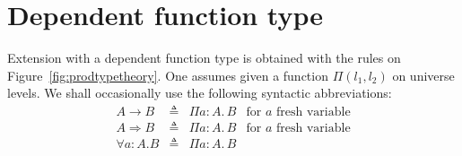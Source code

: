 \documentclass{article}
\newcommand{\defeq}{\triangleq}
\newcommand{\mkprod}[3]{\Pi {#1}\!:\!{#2}.\,{#3}}
\newcommand{\prodsort}[2]{\Pi ({#1},{#2})}
\begin{document}
\section{Dependent function type}

Extension with a dependent function type is obtained with the rules on
Figure~\ref{fig:prodtypetheory}. One assumes given a function
$\prodsort{l_1}{l_2}$ on universe levels. We shall occasionally use the following syntactic abbreviations:
$$
\begin{array}{lcll}
A \rightarrow B & \defeq & \mkprod{a}{A}{B} & \mbox{for $a$ fresh variable}\\
A \Rightarrow B & \defeq & \mkprod{a}{A}{B} & \mbox{for $a$ fresh variable}\\
\forall a:A. B & \defeq & \mkprod{a}{A}{B}\\
\end{array}
$$
\end{document}
